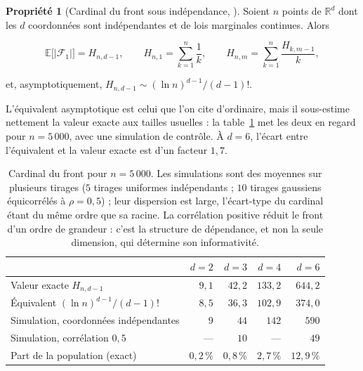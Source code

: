 \documentclass[11pt,a4paper]{article}
\theoremstyle{definition}
\newtheorem{propriete}{Propriété}[section]
\theoremstyle{remark}
\newcommand{\R}{\mathbb{R}}
\newcommand{\EE}{\mathbb{E}}
\newcommand{\abs}[1]{\left\lvert #1 \right\rvert}
\begin{document}
\medskip

\begin{propriete}[Cardinal du front sous indépendance, \citealp{bentley1978}]
  \label{prop:cardinal}
  Soient $n$ points de $\R^d$ dont les $d$ coordonnées sont indépendantes et de lois
  marginales continues. Alors

  \medskip

  \[
    \EE\big[\abs{\mathcal{F}_1}\big] = H_{n,d-1},
    \qquad
    H_{n,1} = \sum_{k=1}^{n} \frac{1}{k},
    \qquad
    H_{n,m} = \sum_{k=1}^{n} \frac{H_{k,m-1}}{k},
  \]

  \bigskip

  et, asymptotiquement, $H_{n,d-1} \sim (\ln n)^{d-1} / (d-1)!$.
\end{propriete}

\bigskip

L'équivalent asymptotique est celui que l'on cite d'ordinaire, mais il sous-estime
nettement la valeur exacte aux tailles usuelles : la table~\ref{tab:cardinal} met les
deux en regard pour $n = 5\,000$, avec une simulation de contrôle. À $d = 6$, l'écart
entre l'équivalent et la valeur exacte est d'un facteur $1{,}7$.

\medskip

\begin{table}[htbp]
  \centering
  \small
  \renewcommand{\arraystretch}{1.25}
  \begin{tabular}{@{}l r r r r@{}}
    \toprule
    & $d = 2$ & $d = 3$ & $d = 4$ & $d = 6$ \\
    \midrule
    Valeur exacte $H_{n,d-1}$ & $9{,}1$ & $42{,}2$ & $133{,}2$ & $644{,}2$ \\
    Équivalent $(\ln n)^{d-1}/(d-1)!$ & $8{,}5$ & $36{,}3$ & $102{,}9$ & $374{,}0$ \\
    Simulation, coordonnées indépendantes & $9$ & $44$ & $142$ & $590$ \\
    Simulation, corrélation $0{,}5$ & --- & $10$ & --- & $49$ \\
    \midrule
    Part de la population (exact) & $0{,}2\,\%$ & $0{,}8\,\%$ & $2{,}7\,\%$ &
      $12{,}9\,\%$ \\
    \bottomrule
  \end{tabular}
  \caption{Cardinal du front pour $n = 5\,000$. Les simulations sont des moyennes sur
  plusieurs tirages ($5$ tirages uniformes indépendants ; $10$ tirages gaussiens
  équicorrélés à $\rho = 0{,}5$) ; leur dispersion est large, l'écart-type du cardinal
  étant du même ordre que sa racine. La corrélation positive réduit le front d'un ordre
  de grandeur : c'est la structure de dépendance, et non la seule dimension, qui
  détermine son informativité.}
  \label{tab:cardinal}
\end{table}
\end{document}
